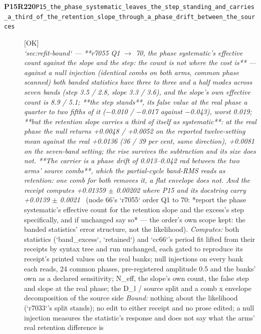 \begin{description}
\item[\textbf{P15R220}\quad\texttt{P15\_the\_phase\_systematic\_leaves\_the\_step\_standing\_and\_carries\_a\_third\_of\_the\_retention\_slope\_through\_a\_phase\_drift\_between\_the\_sources}]\hfill\textsf{[OK]}\\
\textit{`sec:refit-bound` --- **r7055 Q1 \ensuremath{\to} 70, the phase systematic's effective count against the slope and the step: the count is not where the cost is** --- against a null injection (identical combs on both arms, common phase scanned) both banded statistics have three to three and a half modes across seven bands (step 3.5 / 2.8, slope 3.3 / 3.6), and the slope's own effective count is 8.9 / 5.1; **the step stands**, its false value at the real phase a quarter to two fifths of it (\ensuremath{-}0.010 / \ensuremath{-}0.017 against \ensuremath{-}0.043), worst 0.019; **but the retention slope carries a third of itself as systematic**: at the real phase the null returns +0.0048 / +0.0052 on the reported twelve-setting mean against the real +0.0136 (36 / 39 per cent, same direction), +0.0081 on the seven-band setting; the rise survives the subtraction and its size does not. **The carrier is a phase drift of 0.013--0.042 rad between the two arms' source combs**, which the partial-cycle band-RMS reads as retention: one comb for both removes it, a flat envelope does not. And the receipt computes +0.01359 \ensuremath{\pm} 0.00202 where P15 and its docstring carry +0.0139 \ensuremath{\pm} 0.0021} \ (node 66's `r7055` order Q1 to 70: *report the phase systematic's effective count for the retention slope and the excess's step specifically, and if unchanged say so* --- the order's own scope kept: the banded statistics' error structure, not the likelihood). 
\emph{Computes:} both statistics (`band\_excess`, `retained`) and `cc66`'s period fit lifted from their receipts by syntax tree and run unchanged, each gated to reproduce its receipt's printed values on the real banks; null injections on every bank each reads, 24 common phases, pre-registered amplitude 0.5 and the banks' own as a declared sensitivity; N\_eff, the slope's own count, the false step and slope at the real phase; the D\_l / source split and a comb x envelope decomposition of the source side
 \emph{Bound:}  nothing about the likelihood (`r7033`'s split stands); no edit to either receipt and no prose edited; a null injection measures the statistic's response and does not say what the arms' real retention difference is

\end{description}
